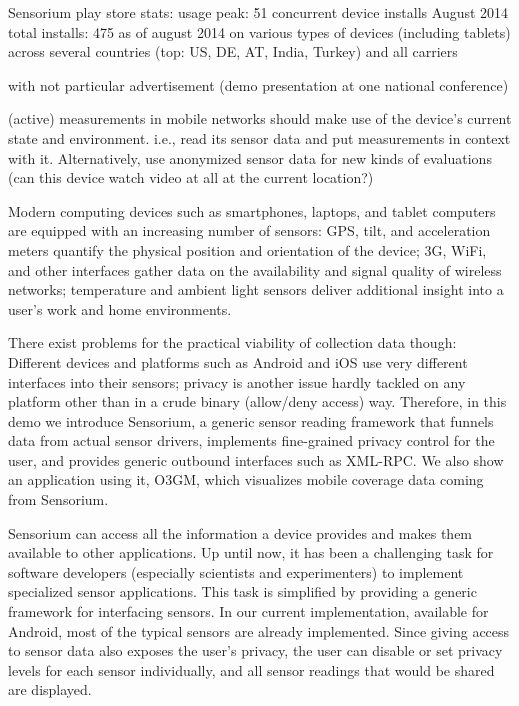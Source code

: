 Sensorium play store stats:
usage peak: 51 concurrent device installs August 2014
total installs: 475 as of august 2014
on various types of devices (including tablets)
across several countries (top: US, DE, AT, India, Turkey)
and all carriers

with not particular advertisement (demo presentation at one national conference)

(active) measurements in mobile networks should make use of the device's current state and environment. i.e., read its sensor data and put measurements in context with it. Alternatively, use anonymized sensor data for new kinds of evaluations (can this device watch video at all at the current location?)


Modern computing devices such as smartphones, laptops, and tablet computers are equipped with an increasing number of sensors: \gls{GPS}, tilt, and acceleration meters quantify the physical position and orientation of the device; 3G, WiFi, and other  interfaces gather data on the availability and signal quality of wireless networks; temperature and ambient light sensors deliver additional insight into a user's work and home environments.

There exist problems for the practical viability of collection data though: Different devices and platforms such as Android and iOS use very different interfaces into their sensors; privacy is another issue hardly tackled on any platform other than in a crude binary (allow/deny access) way. Therefore, in this demo we introduce Sensorium, a generic sensor reading framework that funnels data from actual sensor drivers, implements fine-grained privacy control for the user, and provides generic outbound interfaces such as \acrshort{XML}-\acrshort{RPC}. We also show an application using it, \gls{O3GM}, which visualizes mobile coverage data coming from Sensorium.

Sensorium can access all the information a device provides and makes them available to other applications. Up until now, it has been a challenging task for software developers (especially scientists and experimenters) to implement specialized sensor applications. This task is simplified by providing a generic framework for interfacing sensors. In our current implementation, available for Android, most of the typical sensors are already implemented. Since giving access to sensor data also exposes the user's privacy, the user can disable or set privacy levels for each sensor individually, and all sensor readings that would be shared are displayed. %
\\

